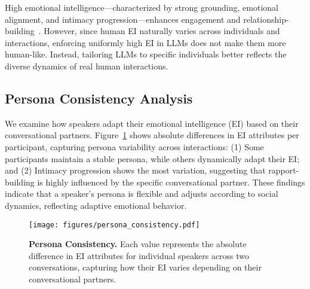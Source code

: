 High emotional intelligence—characterized by strong grounding, emotional alignment, and intimacy progression—enhances engagement and relationship-building~\cite{altman1973social, hatfield1993emotional, derks2008role, huang2017doesn, niederhoffer2002linguistic}.  
However, since human EI naturally varies across individuals and interactions, enforcing uniformly high EI in LLMs does not make them more human-like.  
Instead, tailoring LLMs to specific individuals better reflects the diverse dynamics of real human interactions.  


\subsection{Persona Consistency Analysis}  
\label{ssec:analysis-persona}  
We examine how speakers adapt their emotional intelligence (EI) based on their conversational partners.  
Figure~\ref{fig:persona-consistency} shows absolute differences in EI attributes per participant, capturing persona variability across interactions:
(1) Some participants maintain a stable persona, while others dynamically adapt their EI; and
(2) Intimacy progression shows the most variation, suggesting that rapport-building is highly influenced by the specific conversational partner.
These findings indicate that a speaker's persona is flexible and adjusts according to social dynamics, reflecting adaptive emotional behavior.

\begin{figure}[t!]
    \centering
    \setlength{\tabcolsep}{0pt} %
    \texttt{[image: figures/persona\_consistency.pdf]}
    \vspace{-0.5cm}
    \caption{\textbf{Persona Consistency.} Each value represents the absolute difference in EI attributes for individual speakers across two conversations, capturing how their EI varies depending on their conversational partners.}
    \label{fig:persona-consistency}
    \vspace{-0.5cm}
\end{figure}